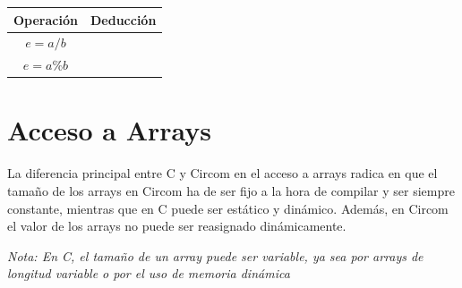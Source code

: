 \documentclass[a4paper,10pt]{article}
\begin{document}
		\vspace{0.2cm}
		
		\begin{tabular}{|c|>{\centering\arraybackslash}p{14cm}|}
			\hline
			\textbf{Operación} & \textbf{Deducción} \\
			\hline
			
			\texttt{$e= a / b$} & 
			\makecell[c]{ 
				$$ 
				\begin{prooftree} 
					\hypo{TC(a) = (C_1, a')} 
					\hypo {TC(b) = (C_2, b')} 
					\infer2{TC(a / b) = (C_1 \wedge C_2 \wedge \{v_{aux} = b' * q'\}, a' = v_{aux} + r')}
				\end{prooftree} 
				$$} \\
			
			\hline
			
			\texttt{$e = a \% b$} & 
			\makecell[c]{ 
				$$ 
				\begin{prooftree} 
					\hypo{TC(a) = (C_1, a')} 
					\hypo {TC(b) = (C_2, b')} 
					\infer2{TC(a \% b) = (C_1 \wedge C_2 \wedge \{v_{aux} = a'/b'\} \wedge \{v_{aux_2} = b * v_{aux}\}, a' - v_{aux_2})}
				\end{prooftree} 
				$$} \\
			\hline
		\end{tabular}
		
		\section{Acceso a Arrays}
		
		\noindent La diferencia principal entre C y Circom en el acceso a arrays radica en que el tamaño de los arrays en Circom ha de ser fijo a la hora de compilar y ser siempre constante, mientras que en C puede ser estático y dinámico. Además, en Circom el valor de los arrays no puede ser reasignado dinámicamente.
		
		\vspace{0.3cm}
		
		\noindent \textit{Nota: En C, el tamaño de un array puede ser variable, ya sea por arrays de longitud variable o por el uso de memoria dinámica}
		
		\vspace{0.3cm}
		
\end{document}
